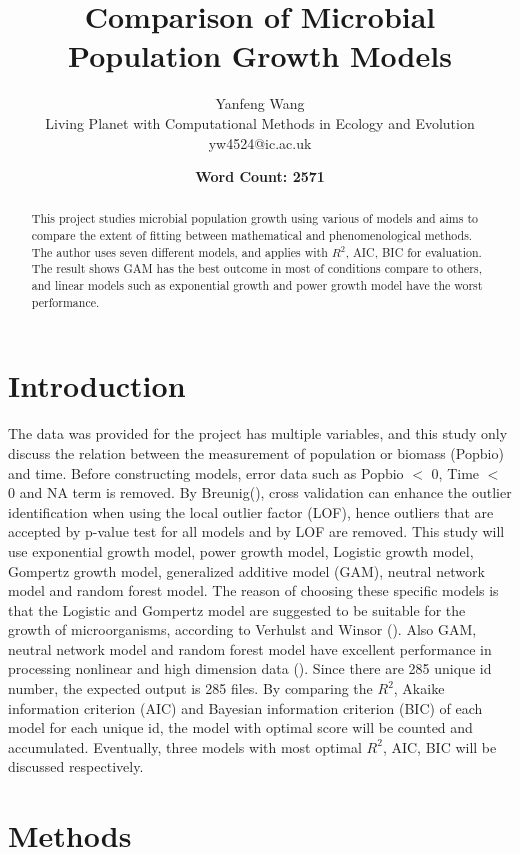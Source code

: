 \documentclass[11pt]{article}
\title{Comparison of Microbial Population Growth Models}
\author{Yanfeng Wang \\
Living Planet with Computational Methods in Ecology and Evolution\\
yw4524@ic.ac.uk}
\date{\textbf{Word Count: 2571}}
\begin{document}
\maketitle

\begin{abstract}
This project studies microbial population growth using various of models and aims to compare the extent of fitting between mathematical and phenomenological methods. The author uses seven different models, and applies with $R^2$, AIC, BIC for evaluation. The result shows GAM has the best outcome in most of conditions compare to others, and linear models such as exponential growth and power growth model have the worst performance.
\end{abstract}

\section{Introduction}
The data was provided for the project has multiple variables, and this study only discuss the relation between the measurement of population or biomass (Popbio) and time. Before constructing models, error data such as Popbio $<$ 0, Time $<$ 0 and NA term is removed. By Breunig(\cite{breunig2000lof}), cross validation can enhance the outlier identification when using the local outlier factor (LOF), hence outliers that are accepted by p-value test for all models and by LOF are removed. This study will use exponential growth model, power growth model, Logistic growth model, Gompertz growth model, generalized additive model (GAM), neutral network model and random forest model. The reason of choosing these specific models is that the Logistic and Gompertz model are suggested to be suitable for the growth of microorganisms, according to Verhulst and Winsor (\cite{verhulst1838logistic, winsor1932gompertz}). Also GAM, neutral network model and random forest model have excellent performance in processing nonlinear and high dimension data (\cite{hastie1986gam, mcculloch1943nn, breiman2001rf, wood2017gam}). Since there are 285 unique id number, the expected output is 285 files. By comparing the $R^2$, Akaike information criterion (AIC) and Bayesian information criterion (BIC) of each model for each unique id, the model with optimal score will be counted and accumulated. Eventually, three models with most optimal $R^2$, AIC, BIC will be discussed respectively.

\section{Methods}
\end{document}

